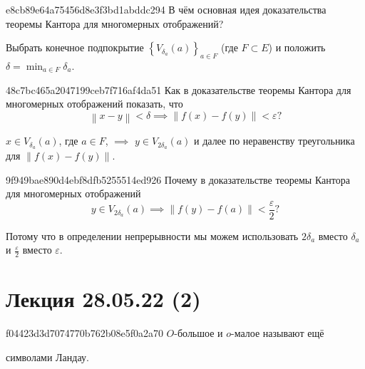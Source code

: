 \begin{note}{e8cb89e64a75456d8e3f3bd1abddc294}
    В чём основная идея доказательства теоремы Кантора для многомерных отображений?

    \begin{cloze}{1}
        Выбрать конечное подпокрытие \({ \left\{ V_{\delta_a}(a) \right\}_{a \in F} }\) (где \({ F \subset E }\)) и положить \({ \displaystyle \delta = \min_{a \in F} \delta_a }\).
    \end{cloze}
\end{note}

\begin{note}{48c7bc465a2047199ceb7f716af4da51}
    Как в доказательстве теоремы Кантора для многомерных отображений показать, что
    \[
        \displaystyle \left\lVert x - y \right\rVert < \delta \implies \left\lVert f(x) - f(y) \right\rVert < \varepsilon?
    \]

    \begin{cloze}{1}
        \({ x \in V_{\delta_a}(a) }\), где \({ a \in F }\), \({ \implies }\) \({ y \in V_{2\delta_a}(a) }\) и далее по неравенству треугольника для \({ \left\lVert f(x) - f(y) \right\rVert }\).
    \end{cloze}
\end{note}

\begin{note}{9f949bae890d4ebf8dfb5255514ed926}
    Почему в доказательстве теоремы Кантора для многомерных отображений
    \[
        y \in V_{2\delta_a}(a) \implies \left\lVert f(y) - f(a) \right\rVert < \frac{\varepsilon}{2}?
    \]

    \begin{cloze}{1}
        Потому что в определении непрерывности мы можем использовать \({ 2\delta_a }\) вместо \({ \delta_a }\) и \({ \frac{\varepsilon}{2} }\) вместо \({ \varepsilon }\).
    \end{cloze}
\end{note}

\section{Лекция 28.05.22 (2)}
\begin{note}{f04423d3d7074770b762b08e5f0a2a70}
    \({ O }\)-большое и \({ o }\)-малое называют ещё \begin{icloze}{1}символами Ландау.\end{icloze}
\end{note}

